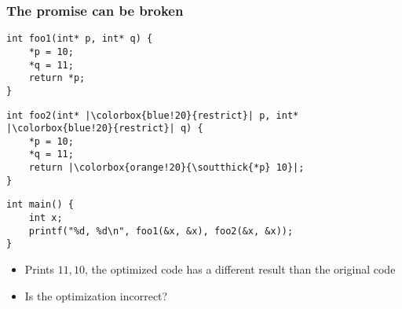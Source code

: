 \begin{frame}[fragile]
\raggedright
\frametitle{The promise can be broken}
\begin{minipage}{0.4\textwidth}
\begin{verbatim}
int foo1(int* p, int* q) {   
    *p = 10;
    *q = 11;
    return *p;
}
\end{verbatim}
\end{minipage}%
\begin{minipage}{0.6\textwidth}
\begin{verbatim}
int foo2(int* |\colorbox{blue!20}{restrict}| p, int* |\colorbox{blue!20}{restrict}| q) {   
    *p = 10;
    *q = 11;
    return |\colorbox{orange!20}{\soutthick{*p} 10}|;
}
\end{verbatim}
\end{minipage}

\pause

\begin{verbatim}
int main() {
    int x;
    printf("%d, %d\n", foo1(&x, &x), foo2(&x, &x));
}
\end{verbatim}

\begin{figure}
\centering
{}
\end{figure}

\begin{itemize}
    \item Prints $11, 10$, \ie the optimized code has a different result than the original code
    \item Is the optimization incorrect?
\end{itemize}

\end{frame}
